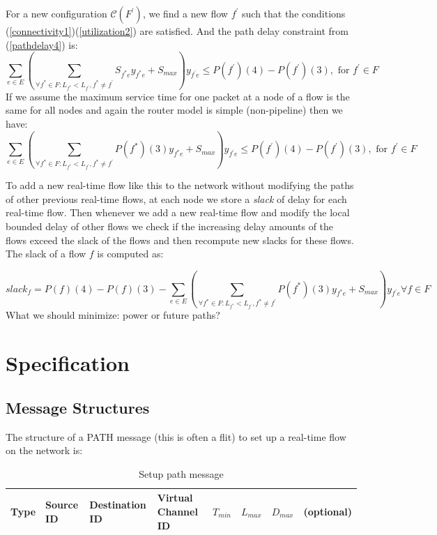 \documentclass[10pt]{article}
\begin{document}
For a new configuration $\mathcal{C}(F^{'})$, we find a new flow $f^{'}$ such that
the conditions (\ref{connectivity1})(\ref{utilization2}) are satisfied. And the path delay
constraint from (\ref{pathdelay4}) is:
\begin{equation}\label{pathdelay5}
\sum_{e \in E} (\sum_{\forall f^{*} \in F:L_{f^{*}} < L_{f^{'}}, f^{*} \neq f^{'}}S_{f^{*}e}y_{f^{*}e}+S_{max})y_{f^{'}e} 
\leq P(f^{'})(4)-P(f^{'})(3), \mbox{ for } f^{'} \in F
\end{equation}
If we assume the maximum service time for one packet at a node of a flow is the same
for all nodes and again the router model is simple (non-pipeline) then we have:
\begin{equation}\label{pathdelay5}
\sum_{e \in E} (\sum_{\forall f^{*} \in F:L_{f^{*}} < L_{f^{'}}, f^{*} \neq f^{'}}P(f^{*})(3)y_{f^{*}e}+S_{max})y_{f^{'}e} 
\leq P(f^{'})(4)-P(f^{'})(3), \mbox{ for } f^{'} \in F
\end{equation}

To add a new real-time flow like this to the network without modifying the paths
of other previous real-time flows, at each node we store a {\em slack} of delay
for each real-time flow. Then whenever we add a new real-time flow and modify the local
bounded delay of other flows we check if the increasing delay amounts of the flows
exceed the slack of the flows and then recompute new slacks for these flows. The slack
of a flow $f$ is computed as:

\begin{equation}
	slack_f=P(f)(4)-P(f)(3) - 
\sum_{e \in E} (\sum_{\forall f^{*} \in F:L_{f^{*}} < L_{f^{'}}, f^{*} \neq f^{'}}P(f^{*})(3)y_{f^{*}e}+S_{max})y_{f^{'}e} 
 \forall f \in F
\end{equation}
What we should minimize: power or future paths?

\section{Specification}
\subsection{Message Structures}
The structure of a PATH message (this is often a flit) to set up a real-time 
flow on the network is:

\begin{table}[h]
\begin{center}
  \begin{tabular}{ | l | l | l | l | l | l | l | l | }
    \hline
	Type & Source ID & Destination ID & Virtual Channel ID & 
	$T_{min}$ & $L_{max}$ & $D_{max}$ & (optional) \\
    \hline
  \end{tabular}
\end{center}
\caption{Setup path message}
\label{table:PathMsg}
\end{table}
\end{document}
